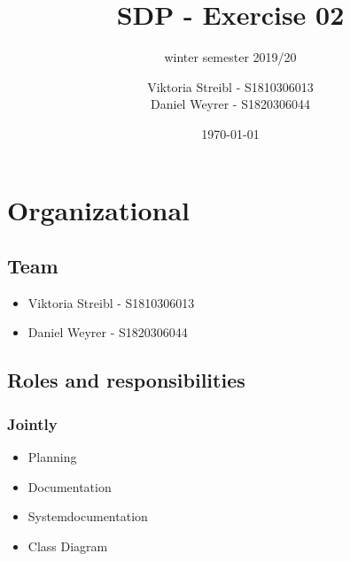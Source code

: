 

\graphicspath{{./}}



\title{SDP - Exercise 02} %
\subtitle{winter semester 2019/20} %
\author{
Viktoria Streibl - S1810306013\\
  Daniel Weyrer - S1820306044
} %
\date{\today} %

\maketitle %

\newpage
\tableofcontents %
\newpage


\section{Organizational}
\subsection{Team}
\begin{itemize}
	\item Viktoria 	Streibl 		- 	S1810306013
	\item Daniel 	Weyrer		-	S1820306044
\end{itemize}

\subsection{Roles and responsibilities}
\subsubsection{Jointly}
\begin{itemize}
	\item Planning
	\item Documentation
	\item Systemdocumentation
	\item Class Diagram
\end{itemize}

